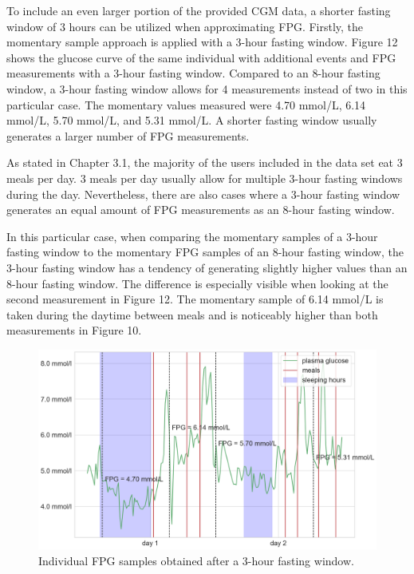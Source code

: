 \documentclass[english, 12pt, a4paper, elec, utf8, a-1b, online]{aaltothesis}
\begin{document}
To include an even larger portion of the provided CGM data, a shorter fasting window of 3 hours can be utilized when approximating FPG\cite{moebus_impact_2011}. 
Firstly, the momentary sample approach is applied with a 3-hour fasting window. Figure 12 shows the glucose 
curve of the same individual with additional events and FPG measurements with a 3-hour fasting window. Compared to an 8-hour fasting window,
a 3-hour fasting window allows for 4 measurements instead of two in  this particular case. The momentary values measured were 4.70 mmol/L,
6.14 mmol/L, 5.70 mmol/L, and 5.31 mmol/L. A shorter fasting window usually generates a larger number of FPG measurements. 

As stated in Chapter 3.1, the majority of the users included in the data set eat 3 meals per day. 3 meals per day usually allow for multiple 3-hour fasting 
windows during the day. Nevertheless, there are also cases where a 3-hour fasting window generates an 
equal amount of FPG measurements as an 8-hour fasting window. 

In this particular case, when comparing the momentary samples of a 3-hour fasting window to the momentary FPG samples of an 8-hour fasting window, 
the 3-hour fasting window has 
a tendency of generating slightly higher values than an 8-hour fasting window. The difference is especially visible when looking at the second measurement in Figure 12. The momentary sample of 6.14 mmol/L is taken during the daytime between meals and is noticeably higher than both measurements in Figure 10.

\begin{figure}[H]
\centering
\includegraphics[width=14cm]{images/user_glucose_and_fpg3.png}
\caption{Individual FPG samples obtained after a 3-hour fasting window.}
\end{figure}
\end{document}
